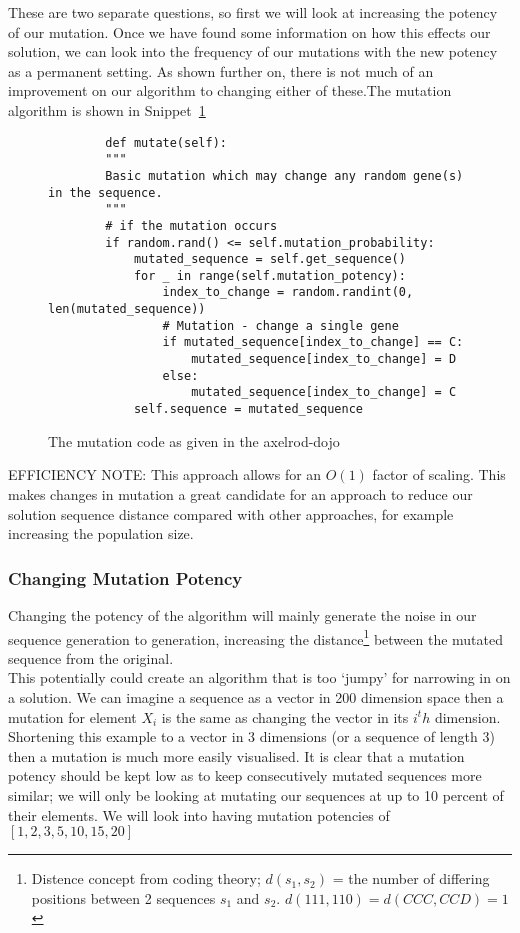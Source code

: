 These are two separate questions, so first we will look at increasing the potency of our mutation. 
Once we have found some information on how this effects our solution, we can look into the frequency of our mutations with the new potency as a permanent setting.
As shown further on, there is not much of an improvement on our algorithm to changing either of these.The mutation algorithm is shown in Snippet~\ref{code:mutate}\\
\begin{figure}
    \begin{verbatim}
        def mutate(self):
        """
        Basic mutation which may change any random gene(s) in the sequence.
        """
        # if the mutation occurs
        if random.rand() <= self.mutation_probability:
            mutated_sequence = self.get_sequence()
            for _ in range(self.mutation_potency):
                index_to_change = random.randint(0, len(mutated_sequence))
                # Mutation - change a single gene
                if mutated_sequence[index_to_change] == C:
                    mutated_sequence[index_to_change] = D
                else:
                    mutated_sequence[index_to_change] = C
            self.sequence = mutated_sequence
    \end{verbatim}
    \caption{The mutation code as given in the axelrod-dojo}\label{code:mutate}    
\end{figure}

EFFICIENCY NOTE\@: This approach allows for an \(O(1)\) factor of scaling.
This makes changes in mutation a great candidate for an approach to reduce our solution sequence distance compared with other approaches, for example increasing the population size.\\

\subsubsection{Changing Mutation Potency}
Changing the potency of the algorithm will mainly generate the noise in our sequence generation to generation, increasing the distance\footnote{Distence concept from coding theory; \(d(s_1,s_2)\) =  the number of differing positions between 2 sequences \(s_1\) and \(s_2\). \(d(111,110) = d(CCC,CCD) = 1 \)} between the mutated sequence from the original.\\ 

This potentially could create an algorithm that is too `jumpy' for narrowing in on a solution.
We can imagine a sequence as a vector in 200 dimension space then a mutation for element \(X_i\) is the same as changing the vector in its \(i^th\) dimension.
Shortening this example to a vector in 3 dimensions (or a sequence of length 3) then a mutation is much more easily visualised.
It is clear that a mutation potency should be kept low as to keep consecutively mutated sequences more similar; we will only be looking at mutating our sequences at up to 10 percent of their elements.
We will look into having mutation potencies of \([1,2,3,5,10,15,20]\)

